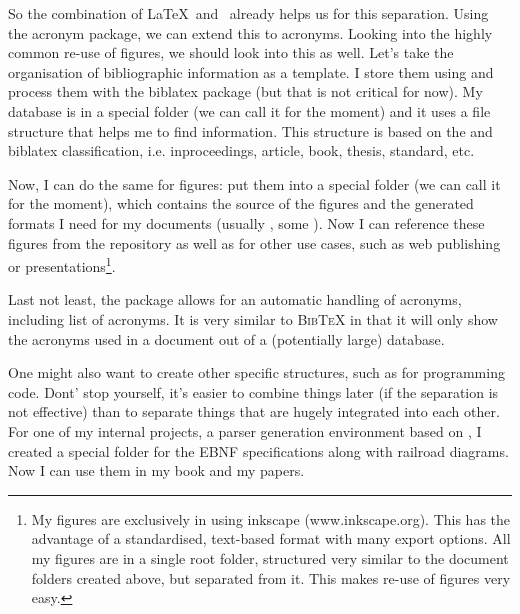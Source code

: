 
So the combination of \LaTeX~and \BibTeX~already helps us for this separation.
Using the acronym package, we can extend this to acronyms. Looking into the highly
common re-use of figures, we should look into this as well. Let's take the organisation 
of bibliographic information as a template. I store them using \BibTeX and process them 
with the biblatex package (but that is not critical for now). My \BibTeX database is in 
a special folder (we can call it  for the moment) and it uses 
a file structure that helps me to find information. This structure is based on the \BibTeX
and biblatex classification, i.e. inproceedings, article, book, thesis, standard, etc.

Now, I can do the same for figures: put them into a special folder (we can call it
 for the moment), which contains the source of the figures and the
generated formats I need for my documents (usually , some ). Now I can reference these 
figures from the repository as well as for other use cases, such as web publishing or 
presentations\footnote{My figures are exclusively in  using inkscape (www.inkscape.org).
This has the advantage of a standardised, text-based format with many export options. All my
figures are in a single root folder, structured very similar to the 
document folders created above, but separated from it. This makes re-use of figures very easy.}.

Last not least, the  package 
allows for an automatic handling of acronyms, including list of acronyms. 
It is very similar to {\scshape Bib\TeX} in that it will only show the 
acronyms used in a document out of a (potentially large) database.

One might also want to create other specific structures, such as for programming code. Dont'
stop yourself, it's easier to combine things later (if the separation is not effective) than 
to separate things that are hugely integrated into each other. For one of my internal projects,
a parser generation environment based on , I created a special folder for the EBNF specifications
along with railroad diagrams. Now I can use them in my book and my papers.

